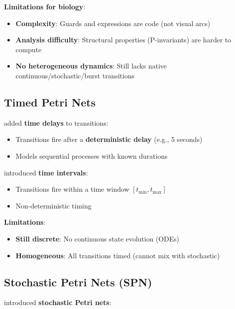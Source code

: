 \textbf{Limitations for biology}:

\begin{itemize}
    \item \textbf{Complexity}: Guards and expressions are code (not visual arcs)
    \item \textbf{Analysis difficulty}: Structural properties (P-invariants) are harder to compute
    \item \textbf{No heterogeneous dynamics}: Still lacks native continuous/stochastic/burst transitions
\end{itemize}

\subsection{Timed Petri Nets}
\label{subsec:timed-pn}

\citet{Ramchandani1974} added \textbf{time delays} to transitions:

\begin{itemize}
    \item Transitions fire after a \textbf{deterministic delay} (e.g., 5 seconds)
    \item Models sequential processes with known durations
\end{itemize}

\citet{Merlin1974} introduced \textbf{time intervals}:

\begin{itemize}
    \item Transitions fire within a time window $[t_{\min}, t_{\max}]$
    \item Non-deterministic timing
\end{itemize}

\textbf{Limitations}:

\begin{itemize}
    \item \textbf{Still discrete}: No continuous state evolution (ODEs)
    \item \textbf{Homogeneous}: All transitions timed (cannot mix with stochastic)
\end{itemize}

\subsection{Stochastic Petri Nets (SPN)}
\label{subsec:stochastic-pn}

\citet{Molloy1981} introduced \textbf{stochastic Petri nets}:

